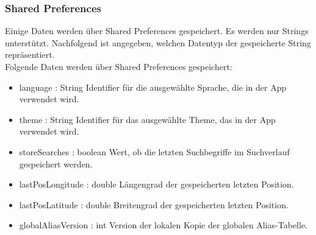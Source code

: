 \subsubsection{Shared Preferences}
Einige Daten werden über Shared Preferences gespeichert. Es werden nur Strings unterstützt. 
Nachfolgend ist angegeben, welchen Datentyp der gespeicherte String repräsentiert.\\
Folgende Daten werden über Shared Preferences gespeichert:
\begin{itemize}
    \item language : String Identifier für die ausgewählte Sprache, die in der App verwendet wird.
    \item theme : String Identifier für das ausgewählte Theme, das in der App verwendet wird.
    \item storeSearches : boolean Wert, ob die letzten Suchbegriffe im Suchverlauf gespeichert werden.
    \item lastPosLongitude : double Längengrad der gespeicherten letzten Position.
    \item lastPosLatitude : double Breitengrad der gespeicherten letzten Position.
    \item globalAliasVersion : int Version der lokalen Kopie der globalen Alias-Tabelle.
\end{itemize}